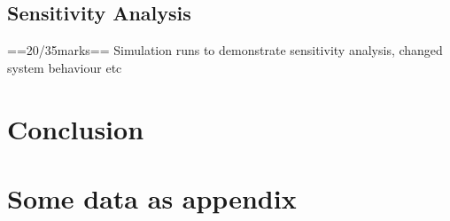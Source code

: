\documentclass[a4paper,11pt,fleqn]{report}
\begin{document}
\section{Sensitivity Analysis}
==20/35marks==
Simulation runs to demonstrate sensitivity analysis, changed system behaviour etc 

\chapter{Conclusion}
\acresetall




\appendix
\chapter{Some data as appendix}
\end{document}
